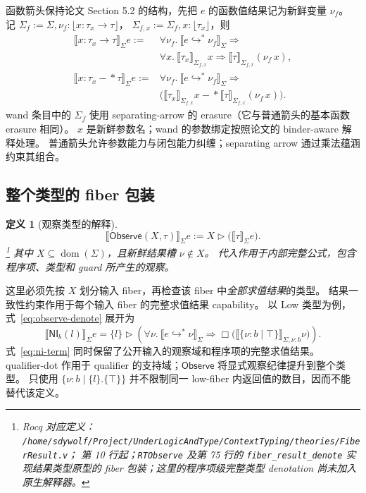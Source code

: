 \documentclass[UTF8,a4paper,11pt,fontset=fandol]{ctexart}
\newcommand{\dom}{\operatorname{dom}}
\newcommand{\oty}[2]{\{\nu:#1\mid #2\}}
\newcommand{\Observe}{\ensuremath{\mathsf{Observe}}}
\newcommand{\Den}[1]{\llbracket #1\rrbracket}
\newcommand{\rocqdefnote}[3]{%
  \footnote{Rocq 对应定义：
  \nolinkurl{/home/sdywolf/Project/UnderLogicAndType/#1}；
  第 #2 行起；#3。}}
\newtheorem{definition}{定义}[section]
\begin{document}
函数箭头保持论文 Section 5.2 的结构，先把 $e$ 的函数值结果记为新鲜变量 $\nu_f$。
记 $\Sigma_f:=\Sigma,\nu_f:\lfloor x:\tau_x\to\tau\rfloor$，
$\Sigma_{f,x}:=\Sigma_f,x:\lfloor\tau_x\rfloor$，则
\begin{align}
 \Den{x:\tau_x\to\tau}_\Sigma e
 := {}&\forall\nu_f.\ \Den{e\hookrightarrow^*\nu_f}_\Sigma\Rightarrow\nonumber\\
 &\forall x.\ \Den{\tau_x}_{\Sigma_{f,x}}x\Rightarrow
                    \Den{\tau}_{\Sigma_{f,x}}(\nu_f\,x),\label{eq:arrow-denote}\\
 \Den{x:\tau_x-\!\ast\tau}_\Sigma e
 := {}&\forall\nu_f.\ \Den{e\hookrightarrow^*\nu_f}_\Sigma\Rightarrow\nonumber\\
 &\bigl(\Den{\tau_x}_{\Sigma_{f,x}}x-\!\ast
                    \Den{\tau}_{\Sigma_{f,x}}(\nu_f\,x)\bigr).
\end{align}
wand 条目中的 $\Sigma_f$ 使用 separating-arrow 的 erasure（它与普通箭头的基本函数 erasure 相同）。
$x$ 是新鲜参数名；wand 的参数绑定按照论文的 binder-aware 解释处理。
普通箭头允许参数能力与闭包能力纠缠；separating arrow 通过乘法蕴涵约束其组合。

\subsection{整个类型的 fiber 包装}

\begin{definition}[观察类型的解释]
\begin{equation}\label{eq:observe-denote}
 \boxed{\Den{\Observe(X,\tau)}_\Sigma e
       :=X\triangleright\bigl(\Den{\tau}_\Sigma e\bigr).}
\end{equation}
\rocqdefnote{ContextTyping/theories/FiberResult.v}{10}{\texttt{RTObserve} 及第 75 行的 \texttt{fiber\_result\_denote} 实现结果类型原型的 fiber 包装；这里的程序项级完整类型 denotation 尚未加入原生解释器}
其中 $X\subseteq\dom(\Sigma)$，且新鲜结果槽 $\nu\notin X$。
代入作用于内部完整公式，包含程序项、类型和 guard 所产生的观察。
\end{definition}

这里必须先按 $X$ 划分输入 fiber，再检查该 fiber 中\emph{全部求值结果}的类型。
结果一致性约束作用于每个输入 fiber 的完整求值结果 capability。
以 Low 类型为例，式~\eqref{eq:observe-denote} 展开为
\begin{equation}\label{eq:ni-term}
 \Den{\mathsf{NI}_b(l)}_\Sigma e
 =\{l\}\triangleright\left(
    \forall\nu.\ \Den{e\hookrightarrow^*\nu}_\Sigma\Rightarrow
       \Box\bigl(\Den{\oty{b}{\top}}_{\Sigma,\nu:b}\nu\bigr)\right).
\end{equation}
式~\eqref{eq:ni-term} 同时保留了公开输入的观察域和程序项的完整求值结果。
qualifier-dot 作用于 qualifier 的支持域；$\Observe$ 将显式观察纪律提升到整个类型。
只使用 $\oty{b}{\{l\}.\{\top\}}$ 并不限制同一 low-fiber 内返回值的数目，因而不能替代该定义。
\end{document}
